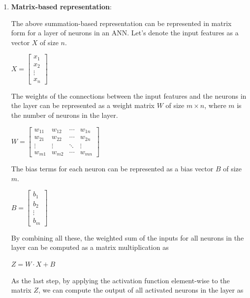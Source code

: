 \documentclass[12pt]{article}
\begin{document}
\begin{description}
\begin{enumerate}
    \item \textbf{Matrix-based representation}:
    
    The above summation-based representation can be represented in matrix form for a layer of neurons in an ANN. Let's denote the input features as a vector $X$ of size $n$.

    \begin{center}
      $\displaystyle{X = \begin{bmatrix} x_1 \\ x_2 \\ \vdots \\ x_n \end{bmatrix}}$
    \end{center}

    The weights of the connections between the input features and the neurons in the layer can be represented as a weight matrix $W$ of size $m \times n$, where $m$ is the number of neurons in the layer.

    \begin{center}
      $\displaystyle{W = \begin{bmatrix} w_{11} & w_{12} & \cdots & w_{1n} \\ w_{21} & w_{22} & \cdots & w_{2n} \\ \vdots & \vdots & \ddots & \vdots \\ w_{m1} & w_{m2} & \cdots & w_{mn} \end{bmatrix}}$
    \end{center}

    The bias terms for each neuron can be represented as a bias vector $B$ of size $m$.

    \begin{center}
      $\displaystyle{B = \begin{bmatrix} b_1 \\ b_2 \\ \vdots \\ b_m \end{bmatrix}}$
    \end{center}

    By combining all these, the weighted sum of the inputs for all neurons in the layer can be computed as a matrix multiplication as

    \begin{center}
      $\displaystyle{Z = W \cdot X + B}$
    \end{center}

    As the last step, by applying the activation function element-wise to the matrix $Z$, we can compute the output of all activated neurons in the layer as


\end{enumerate}
\end{description}
\end{document}
